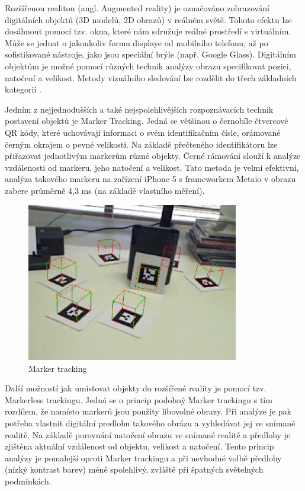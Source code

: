 \documentclass[twoside,12pt]{article}
\begin{document}
Rozšířenou realitou (angl. Augmented reality) je označováno zobrazování digitálních objektů (3D modelů, 2D obrazů) v reálném světě. Tohoto efektu lze dosáhnout pomocí tzv. okna, které nám sdružuje reálné prostředí s virtuálním. Může se jednat o jakoukoliv formu displaye od mobilního telefonu, až po sofistikované nástroje, jako jsou speciální brýle (např. Google Glass). Digitálním objektům je možné pomocí různých technik analýzy obrazu specifikovat pozici, natočení a velikost. Metody vizuálního sledování lze rozdělit do třech základních kategorií \cite{klein_visual_tracking}.

Jedním z nejjednodušších a také nejspolehlivějších rozpoznávacích technik postavení objektů je Marker Tracking. Jedná se většinou o černobíle čtvercové QR kódy, které uchovávají informaci o svém identifikačním čísle, orámované černým okrajem o pevné velikosti. Na základě přečteného identifikátoru lze přiřazovat jednotlivým markerům různé objekty. Černé rámování slouží k analýze vzdálenosti od markeru, jeho natočení a velikost. Tato metoda je velmi efektivní, analýza takového markeru na zařízení iPhone 5 s frameworkem Metaio v obrazu zabere průměrně 4,3 ms (na základě vlastního měření).

\begin{figure}[H]
    \includegraphics[width=350px, center]{images/marker-tracking.jpg}
    \caption{Marker tracking}
    \label{marker_tracking}
\end{figure}

Další možností jak umisťovat objekty do rozšířené reality je pomocí tzv. Markerless trackingu. Jedná se o princip podobný Marker trackingu s tím rozdílem, že namísto markerů jsou použity libovolné obrazy. Při analýze je pak potřeba vlastnit digitální predlohu takového obrázu a vyhledávat jej ve snímané realitě. Na základě porovnání natočení obrazu ve snímané realitě a předlohy je zjištěna aktuální vzdálenost od objektu, velikost a natočení. Tento princip analýzy je pomalejší oproti Marker trackingu a při nevhodné volbě předlohy (nízký kontrast barev) méně spolehlivý, zvláště při špatných světelných podmínkách.
\end{document}
